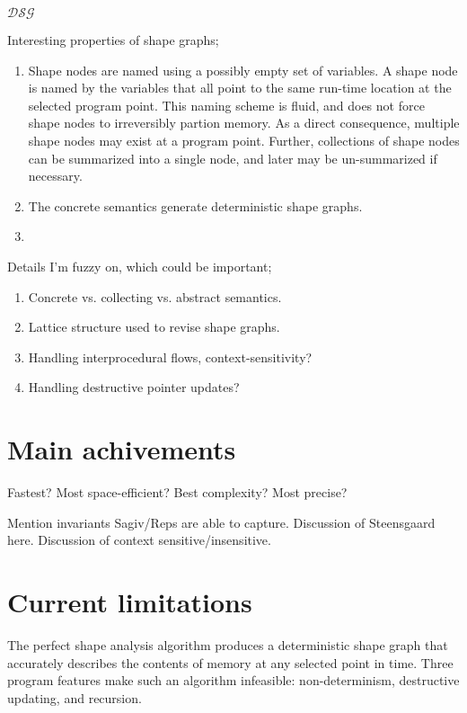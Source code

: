 \documentclass{article}
\begin{document}
$\mathcal{DSG}$



Interesting properties of shape graphs;
\begin{enumerate}[1.]
    \item Shape nodes are named using a possibly empty set of variables. A
        shape node is named by the variables that all point to the same
        run-time location at the selected program point. This naming scheme
        is fluid, and does not force shape nodes to irreversibly partion
        memory. As a direct consequence, multiple shape nodes may exist at
        a program point. Further, collections of shape nodes can be
        summarized into a single node, and later may be un-summarized if
        necessary.

    \item The concrete semantics generate deterministic shape graphs.
    \item 
\end{enumerate}

Details I'm fuzzy on, which could be important;
\begin{enumerate}[1.]
    \item Concrete vs. collecting vs. abstract semantics.
    \item Lattice structure used to revise shape graphs.
    \item Handling interprocedural flows, context-sensitivity?
    \item Handling destructive pointer updates?
\end{enumerate}

\section{Main achivements}

Fastest?
Most space-efficient?
Best complexity?
Most precise?

Mention invariants Sagiv/Reps are able to capture.
Discussion of Steensgaard here.
Discussion of context sensitive/insensitive.

\section{Current limitations}

The perfect shape analysis algorithm produces a deterministic shape graph
that accurately describes the contents of memory at any selected point in
time. Three program features make such an algorithm infeasible:
non-determinism, destructive updating, and recursion. 
\end{document}
